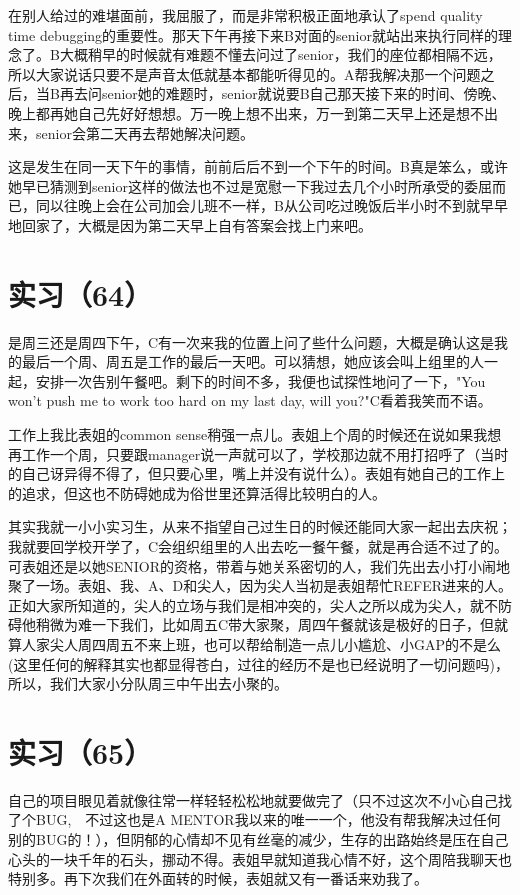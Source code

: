 \documentclass[12pt]{book}
\begin{document}
在别人给过的难堪面前，我屈服了，而是非常积极正面地承认了spend quality time debugging的重要性。那天下午再接下来B对面的senior就站出来执行同样的理念了。B大概稍早的时候就有难题不懂去问过了senior，我们的座位都相隔不远，所以大家说话只要不是声音太低就基本都能听得见的。A帮我解决那一个问题之后，当B再去问senior她的难题时，senior就说要B自己那天接下来的时间、傍晚、晚上都再她自己先好好想想。万一晚上想不出来，万一到第二天早上还是想不出来，senior会第二天再去帮她解决问题。

这是发生在同一天下午的事情，前前后后不到一个下午的时间。B真是笨么，或许她早已猜测到senior这样的做法也不过是宽慰一下我过去几个小时所承受的委屈而已，同以往晚上会在公司加会儿班不一样，B从公司吃过晚饭后半小时不到就早早地回家了，大概是因为第二天早上自有答案会找上门来吧。　


\section{实习（64）　}
\label{sec-5-67}

是周三还是周四下午，C有一次来我的位置上问了些什么问题，大概是确认这是我的最后一个周、周五是工作的最后一天吧。可以猜想，她应该会叫上组里的人一起，安排一次告别午餐吧。剩下的时间不多，我便也试探性地问了一下，"You won't push me to work too hard on my last day, will you?"C看着我笑而不语。

工作上我比表姐的common sense稍强一点儿。表姐上个周的时候还在说如果我想再工作一个周，只要跟manager说一声就可以了，学校那边就不用打招呼了（当时的自己讶异得不得了，但只要心里，嘴上并没有说什么）。表姐有她自己的工作上的追求，但这也不防碍她成为俗世里还算活得比较明白的人。

其实我就一小小实习生，从来不指望自己过生日的时候还能同大家一起出去庆祝；我就要回学校开学了，C会组织组里的人出去吃一餐午餐，就是再合适不过了的。可表姐还是以她SENIOR的资格，带着与她关系密切的人，我们先出去小打小闹地聚了一场。表姐、我、A、D和尖人，因为尖人当初是表姐帮忙REFER进来的人。正如大家所知道的，尖人的立场与我们是相冲突的，尖人之所以成为尖人，就不防碍他稍微为难一下我们，比如周五C带大家聚，周四午餐就该是极好的日子，但就算人家尖人周四周五不来上班，也可以帮给制造一点儿小尴尬、小GAP的不是么(这里任何的解释其实也都显得苍白，过往的经历不是也已经说明了一切问题吗)，所以，我们大家小分队周三中午出去小聚的。 


\section{实习（65）　}
\label{sec-5-68}

自己的项目眼见着就像往常一样轻轻松松地就要做完了（只不过这次不小心自己找了个BUG,　不过这也是A MENTOR我以来的唯一一个，他没有帮我解决过任何别的BUG的！），但阴郁的心情却不见有丝毫的减少，生存的出路始终是压在自己心头的一块千年的石头，挪动不得。表姐早就知道我心情不好，这个周陪我聊天也特别多。再下次我们在外面转的时候，表姐就又有一番话来劝我了。
\end{document}
